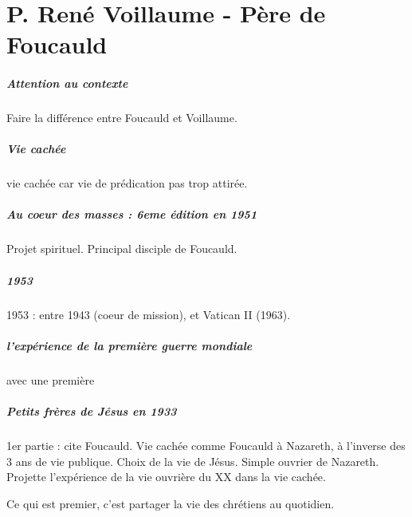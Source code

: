 \chapter{P. René Voillaume - Père de Foucauld}



\paragraph{Attention au contexte} Faire la différence entre Foucauld et Voillaume.

\paragraph{Vie cachée} vie cachée car vie de prédication pas trop attirée.

\paragraph{Au coeur des masses : 6eme édition en 1951} Projet spirituel.
Principal disciple de Foucauld.

\paragraph{1953}
1953 : entre 1943 (coeur de mission), et Vatican II (1963).

\paragraph{l'expérience de la première guerre mondiale} avec une première 

\paragraph{Petits frères de  Jésus en 1933}

1er partie : cite Foucauld. Vie cachée comme Foucauld à Nazareth, à l’inverse des 3 ans de vie publique.
Choix de la vie de Jésus. Simple ouvrier de Nazareth. Projette l’expérience de la vie ouvrière du XX dans la vie cachée.

Ce qui est premier, c’est partager la vie des chrétiens au quotidien.


